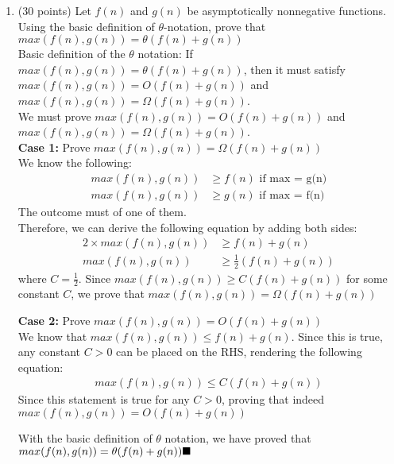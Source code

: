 \documentclass{article}
\begin{document}
    \begin{enumerate}[label=\textbf{Q3}]
        \item (30 points) Let $f(n)$ and $g(n)$ be asymptotically nonnegative functions. Using the basic
        definition of $\theta$-notation, prove that $max(f(n),g(n))= \theta(f(n)+g(n))$\\[0.25in]
        Basic definition of the $\theta$ notation: If $max(f(n),g(n))= \theta(f(n)+g(n))$, then it must 
        satisfy $max(f(n),g(n))= O(f(n)+g(n))$ and $max(f(n),g(n))= \Omega(f(n)+g(n))$.\\
        We must prove $max(f(n),g(n))= O(f(n)+g(n))$ and $max(f(n),g(n))= \Omega(f(n)+g(n))$.\\
        \textbf{Case 1: } Prove $max(f(n),g(n))= \Omega(f(n)+g(n))$\\
        We know the following:
        \begin{align*}
            max(f(n), g(n)) &\geq f(n) \text{ if max = g(n)}\\
            max(f(n), g(n)) &\geq g(n) \text{ if max = f(n)}
        \end{align*}
        The outcome must of one of them.\\
        Therefore, we can derive the following equation by adding both sides:
        \begin{align*}
            2 \times max(f(n), g(n)) &\geq f(n) + g(n)\\
            max(f(n), g(n)) &\geq \frac{1}{2}(f(n) + g(n))
        \end{align*}
        where $C = \frac{1}{2}$. Since $max(f(n), g(n)) \geq C (f(n)+g(n))$ for some constant $C$, 
        we prove that $max(f(n), g(n)) = \Omega(f(n) + g(n))$

        \textbf{Case 2: } Prove $max(f(n), g(n)) = O(f(n) + g(n))$\\
        We know that $max(f(n), g(n)) \leq f(n) + g(n)$. Since this is true, any constant $C > 0$ can be placed
        on the RHS, rendering the following equation:
        \begin{align*}
            max(f(n),g(n)) \leq C(f(n) + g(n))
        \end{align*}
        Since this statement is true for any $C > 0$, proving that indeed $max(f(n), g(n)) = O(f(n) + g(n))$

        With the basic definition of $\theta$ notation, we have proved that $max(f(n), g(n)) = \theta(f(n) + g(n)) \hfill \blacksquare$
    \end{enumerate}
\end{document}
